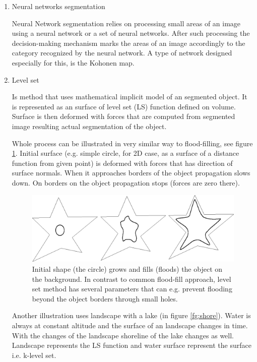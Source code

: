 \begin{enumerate}
  \item  Neural networks segmentation

  Neural Network segmentation relies on processing small areas of an image using a neural network or a set of neural networks.
After such processing the decision-making mechanism marks the areas of an image accordingly to the category recognized by the neural network.
A type of network designed especially for this, is the Kohonen map.

  \item Level set

Is method that uses mathematical implicit model of an segmented object.
It is represented as an surface of level set (LS) function defined on volume.
Surface is then deformed with forces that are computed from segmented image resulting actual segmentation of the object.

Whole process can be illustrated in very similar way to flood-filling, see figure \ref{fg:flooding}.
Initial surface (e.g. simple circle, for 2D case, as a surface of a distance function from given point) is deformed with forces that has direction of surface normals.
When it approaches borders of the object propagation slows down.
On borders on the object propagation stops (forces are zero there).

\begin{figure}
    \centering
    \includegraphics[width=12cm]{data/flooding}
    \caption[Flooding an object]{Initial shape (the circle) grows and fills (floods) the object on the background. In contrast to common flood-fill approach, level set method has several parameters that can e.g. prevent flooding beyond the object borders through small holes.}
    \label{fg:flooding}
\end{figure}

Another illustration uses landscape with a lake (in figure \ref{fg:shore}).
Water is always at constant altitude and the surface of an landscape changes in time.
With the changes of the landscape shoreline of the lake changes as well.
Landscape represents the LS function and water surface represent the surface i.e. k-level set.


\end{enumerate}
